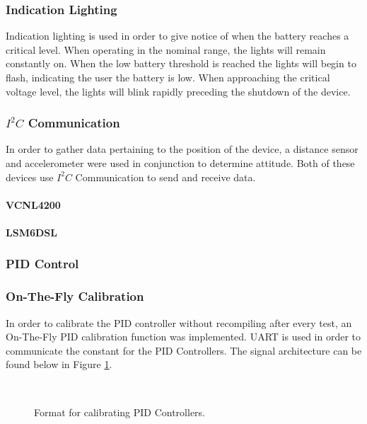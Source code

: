 \documentclass{hitec}
\begin{document}
	\subsubsection{Indication Lighting}
	Indication lighting is used in order to give notice of when the battery reaches a critical level. When operating in the nominal range, the lights will remain constantly on. When the low battery threshold is reached the lights will begin to flash, indicating the user the battery is low. When approaching the critical voltage level, the lights will blink rapidly preceding the shutdown of the device. 
	\subsubsection{$I^{2}C$ Communication}
	In order to gather data pertaining to the position of the device, a distance sensor and accelerometer were used in conjunction to determine attitude. Both of these devices use $I^{2}C$ Communication to send and receive data. 
	

	\paragraph{VCNL4200}
	\paragraph{LSM6DSL}
	\subsubsection{PID Control}
	\subsubsection{On-The-Fly Calibration}
	In order to calibrate the PID controller without recompiling after every test, an On-The-Fly PID calibration function was implemented. UART is used in order to communicate the constant for the PID Controllers. The signal architecture can be found below in Figure \ref{fig: PIDarchitecture}.
	
	\begin{figure}[ht]
		\begin{bytefield}[bitwidth = \linewidth / 72]{72}
			\\
				\end{bytefield}
		\caption{Format for calibrating PID Controllers.}
		\label{fig: PIDarchitecture}
	\end{figure}
\end{document}
